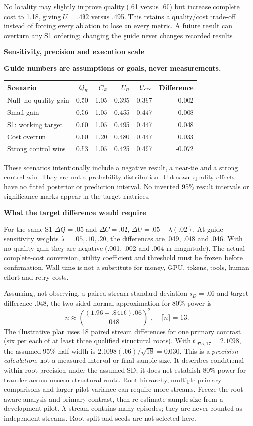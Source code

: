 \documentclass[10pt,a4paper]{article}
\newcommand{\status}{\textcolor{red!70!black}{\textbf{Guide numbers are assumptions or goals, never measurements.}}}
\newcommand{\lead}[1]{\vspace{4pt}\textbf{#1}\par}
\begin{document}
No locality may slightly improve quality (.61 versus .60) but increase complete
cost to 1.18, giving $U=.492$ versus .495. This retains a quality/cost trade-off
instead of forcing every ablation to lose on every metric. A future result can
overturn any S1 ordering; changing the guide never changes recorded results.

\clearpage
\lead{Sensitivity, precision and execution scale}
\status
\begin{center}\small
\begin{tabular}{@{}lrrrrr@{}}\toprule
Scenario & $Q_R$ & $C_R$ & $U_R$ & $U_{\rm ctx}$ & Difference\\\midrule
Null: no quality gain & 0.50 & 1.05 & 0.395 & 0.397 & -0.002\\
Small gain & 0.56 & 1.05 & 0.455 & 0.447 & 0.008\\
S1: working target & 0.60 & 1.05 & 0.495 & 0.447 & 0.048\\
Cost overrun & 0.60 & 1.20 & 0.480 & 0.447 & 0.033\\
Strong control wins & 0.53 & 1.05 & 0.425 & 0.497 & -0.072\\
\bottomrule\end{tabular}\end{center}
These scenarios intentionally include a negative result, a near-tie and a strong
control win. They
are not a probability distribution. Unknown quality effects have no fitted
posterior or prediction interval. No invented 95\% result intervals or
significance marks appear in the target matrices.

\lead{What the target difference would require}
For the same S1 $\Delta Q=.05$ and $\Delta C=.02$,
$\Delta U=.05-\lambda(.02)$. At guide sensitivity weights
$\lambda=.05,.10,.20$, the differences are .049, .048 and .046.
With no quality gain they are negative (.001, .002 and .004 in magnitude).
The actual complete-cost conversion, utility coefficient and threshold must be
frozen before confirmation. Wall time is not a substitute for money, GPU,
tokens, tools, human effort and retry costs.

Assuming, not observing, a paired-stream standard deviation $s_D=.06$ and
target difference .048, the two-sided normal approximation for 80\% power is
\[
 n\approx\left(\frac{(1.96+.8416).06}{.048}\right)^2,
 \quad \lceil n\rceil=13.
\]
The illustrative plan uses 18 paired stream differences for one primary contrast
(six per each of at least three qualified structural roots). With
$t_{.975,17}=2.1098$, the assumed
95\% half-width is $2.1098(.06)/\sqrt{18}=0.030$.
This is a \emph{precision calculation}, not a measured interval or final sample
size. It describes conditional within-root precision under the assumed SD; it
does not establish 80\% power for transfer across unseen structural roots.
Root hierarchy, multiple primary comparisons and larger pilot variance can
require more streams. Freeze the root-aware analysis and primary contrast, then
re-estimate sample size from a development pilot. A stream contains many episodes; they are never
counted as independent streams. Root split and seeds are not selected here.
\end{document}
